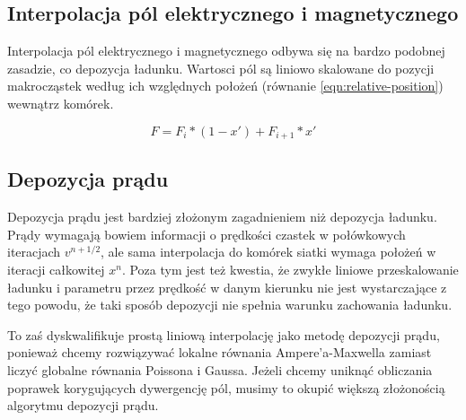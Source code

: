 
    \subsection{Interpolacja pól elektrycznego i magnetycznego}

    Interpolacja pól elektrycznego i magnetycznego odbywa się na bardzo podobnej
    zasadzie, co depozycja ładunku. Wartosci pól są liniowo skalowane do pozycji
    makrocząstek według ich względnych położeń (równanie
    \ref{eqn:relative-position}) wewnątrz komórek.

    \begin{equation}
        F = F_i * (1-x') + F_{i+1} * x'
        \label{eqn:field-interpolation}
    \end{equation}

    \subsection{Depozycja prądu}

    Depozycja prądu jest bardziej złożonym zagadnieniem niż depozycja ładunku.
    Prądy wymagają bowiem informacji o prędkości czastek w połówkowych
    iteracjach $v^{n+1/2}$, ale sama interpolacja do komórek siatki wymaga
    położeń w iteracji całkowitej $x^{n}$. Poza tym jest też kwestia, że zwykłe
    liniowe przeskalowanie ładunku i parametru  przez prędkość w
    danym kierunku nie jest wystarczające z tego powodu, że taki sposób
    depozycji nie spełnia warunku zachowania ładunku.



    To zaś dyskwalifikuje prostą liniową interpolację jako metodę depozycji
    prądu, ponieważ chcemy rozwiązywać lokalne równania Ampere'a-Maxwella
     zamiast liczyć globalne równania Poissona i Gaussa.
    Jeżeli chcemy uniknąć obliczania poprawek korygujących dywergencję pól,
    musimy to okupić większą złożonością algorytmu depozycji prądu.

